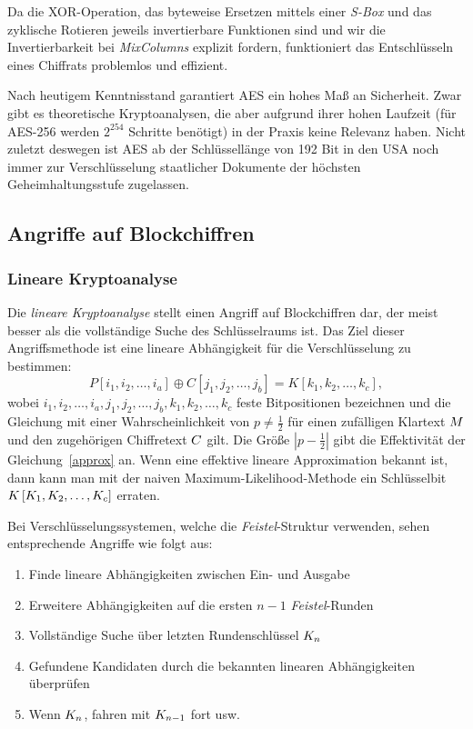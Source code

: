 Da die XOR-Operation, das byteweise Ersetzen mittels einer \textit{S-Box} und das zyklische Rotieren jeweils invertierbare Funktionen sind und wir die Invertierbarkeit bei \textit{MixColumns} explizit fordern, funktioniert das Entschlüsseln eines Chiffrats problemlos und effizient.

Nach heutigem Kenntnisstand garantiert AES ein hohes Maß an Sicherheit. Zwar gibt es theoretische Kryptoanalysen, die aber aufgrund ihrer hohen Laufzeit (für AES-256 werden $2^{254}$ Schritte benötigt) in der Praxis keine Relevanz haben. Nicht zuletzt deswegen ist AES ab der Schlüssellänge von 192 Bit in den USA noch immer zur Verschlüsselung staatlicher Dokumente der höchsten Geheimhaltungsstufe zugelassen.

\subsection{Angriffe auf Blockchiffren}

\subsubsection{Lineare Kryptoanalyse}
\label{sssec:linKryptoanalyse}
Die \textit{lineare Kryptoanalyse} stellt einen Angriff auf Blockchiffren dar, der meist besser als die vollständige Suche des Schlüsselraums ist. Das Ziel dieser Angriffsmethode ist eine lineare Abhängigkeit für die Verschlüsselung zu bestimmen:
\begin{equation}
	P \left[ i_1, i_2, \ldots, i_a \right] \oplus C \left[ j_1, j_2, \ldots, j_b \right]  = K \left[ k_1, k_2, \ldots, k_c \right], \label{approx}
\end{equation}
wobei  $i_1, i_2, \ldots, i_a, j_1, j_2, \ldots, j_b,k_1, k_2, \ldots, k_c$ feste Bitpositionen bezeichnen und die Gleichung mit einer Wahrscheinlichkeit von
$p\neq \frac{1}{2}$ für einen zufälligen Klartext $M$ und den zugehörigen Chiffretext $C$ gilt. Die Größe $\left|{p-\frac{1}{2}}\right|$ gibt die
Effektivität der Gleichung~\ref{approx} an. Wenn eine effektive lineare Approximation bekannt ist, dann kann man mit der naiven Maximum-Likelihood-Methode ein
Schlüsselbit $K \left[ K_1, K_2, \ldots, K_c \right]$ erraten.

Bei Verschlüsselungssystemen, welche die \textit{Feistel}-Struktur verwenden, sehen entsprechende Angriffe wie folgt aus:
\begin{enumerate}
	\item Finde lineare Abhängigkeiten zwischen Ein- und Ausgabe
	\item Erweitere Abhängigkeiten auf die ersten $n - 1$ \textit{Feistel}-Runden
	\item Vollständige Suche über letzten Rundenschlüssel $K_n$
	\item Gefundene Kandidaten durch die bekannten linearen Abhängigkeiten überprüfen
	\item Wenn $K_n$, fahren mit $K_{n-1}$ fort usw.
\end{enumerate}

